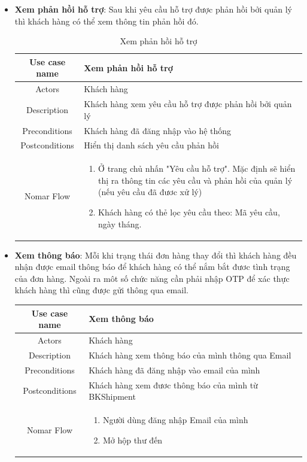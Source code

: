 \begin{itemize}
\begin{itemize}
			\item \textbf{Xem phản hồi hỗ trợ}: Sau khi yêu cầu hỗ trợ được phản hồi bởi quản lý thì khách hàng có thể xem thông tin phản hồi đó.
			
			
			\begin{table}[!htp]
				\centering\begin{tabular}{|c|m{25em}|}
					\hline 
					Use case name & Xem phản hồi hỗ trợ\\ 
					\hline 
					Actors & Khách hàng \\ 
					\hline
					Description & Khách hàng xem yêu cầu hỗ trợ được phản hồi bởi quản lý \\
					\hline 
					Preconditions & Khách hàng đã đăng nhập vào hệ thống \\
					\hline
					Postconditions & Hiển thị danh sách yêu cầu phản hồi \\
					\hline
					Nomar Flow & \begin{enumerate}
						\item Ở trang chủ nhấn "Yêu cầu hỗ trợ". Mặc định sẽ hiển thị ra thông tin các yêu cầu và phản hồi của quản lý (nếu yêu cầu đã đươc xử lý)
						\item Khách hàng có thẻ lọc yêu cầu theo: Mã yêu cầu, ngày tháng.
				
					\end{enumerate}
					\\
					\hline
				\end{tabular}
				\caption{Xem phản hồi hỗ trợ}
			\end{table}
		
		\newpage
		
			
			\item \textbf{Xem thông báo}: Mỗi khi trạng thái đơn hàng thay đổi thì khách hàng đều nhận được email thông báo để khách hàng có thể nắm bắt đươc tình trạng của đơn hàng. Ngoài ra môt số chức năng cần phải nhập OTP để xác thực khách hàng thì cũng được gửi thông qua email.
			
			\begin{table}[!htp]
				\centering\begin{tabular}{|c|m{25em}|}
					\hline 
					Use case name & Xem thông báo\\ 
					\hline 
					Actors & Khách hàng \\ 
					\hline
					Description & Khách hàng xem thông báo của mình thông qua Email \\
					\hline 
					Preconditions & Khách hàng đã đăng nhập vào email của mình \\
					\hline
					Postconditions & Khách hàng xem đươc thông báo của mình từ BKShipment \\
					\hline
					Nomar Flow & \begin{enumerate}
						\item Người dùng đăng nhập Email của mình
						\item Mở hộp thư đến
						

\end{enumerate}
\end{tabular}
\end{table}
\end{itemize}
\end{itemize}
